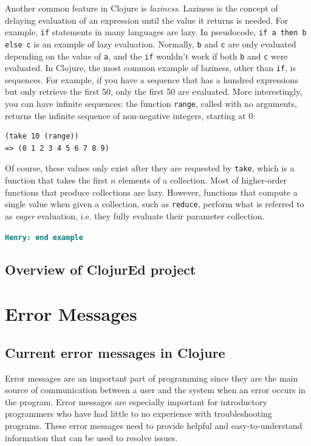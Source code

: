 \documentclass[12pt]{article}
\newcommand{\comment}[1]{{\bf \tt  {#1}}}
\newcommand{\emcomment}[1]{\textcolor{ForestGreen}{\comment{Elena: {#1}}}}
\newcommand{\hfcomment}[1]{\textcolor{Teal}{\comment{Henry: {#1}}}}
\begin{document}
Another common feature in Clojure is {\it  laziness}. Laziness is the concept of delaying evaluation of an expression until the value it returns is needed. For example, \texttt{if} statements in many languages are lazy. In pseudocode, \texttt{if a then b else c} is an example of lazy evaluation. Normally, \texttt{b} and \texttt{c} are only evaluated depending on the value of \texttt{a}, and the \texttt{if} wouldn't work if both \texttt{b} and \texttt{c} were evaluated. 
In Clojure, the most common example of laziness, other than \texttt{if}, is sequences. For example, if you have a sequence that has a hundred expressions but only retrieve the first 50, only the first 50 are evaluated. More interestingly, you can have infinite sequences: the function \texttt{range}, called with no arguments, returns the infinite sequence of non-negative integers, starting at 0:
\begin{verbatim}
(take 10 (range))
=> (0 1 2 3 4 5 6 7 8 9)
\end{verbatim}
Of course, these values only exist after they are requested by \texttt{take}, which is a function that takes the first $n$ elements of a collection. 
Most of higher-order functions that produce collections are lazy. However, functions that compute a single value when given a collection, such as \texttt{reduce}, perform what is referred to as {\it  eager} evaluation, i.e. they fully evaluate their parameter collection.

\hfcomment{end example}


\subsection{Overview of ClojurEd project}\label{sec:project}

\section{Error Messages}\label{sec:errors}

\subsection{Current error messages in Clojure}\label{sec:currentem}
Error messages are an important part of programming since they are the main source of communication between a user and the system when an error occurs in the program.
Error messages are especially important for introductory programmers who have had little to no experience with troubleshooting programs. %
These error messages need to provide helpful and easy-to-understand information that can be used to resolve issues.
\end{document}
